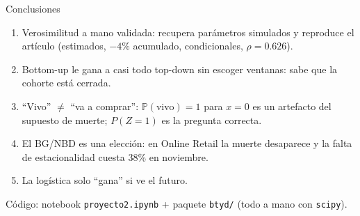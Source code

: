 \documentclass[aspectratio=169,10pt]{beamer}
\newcommand{\pvivo}{\mathbb{P}(\text{vivo})}
\begin{document}
\begin{frame}{Conclusiones}
\begin{enumerate}\small
  \item Verosimilitud a mano validada: recupera parámetros simulados y reproduce el artículo (estimados, $-4\%$ acumulado, condicionales, $\rho=0.626$).
  \item Bottom-up le gana a casi todo top-down sin escoger ventanas: sabe que la cohorte está cerrada.
  \item \alert{``Vivo'' $\neq$ ``va a comprar''}: $\pvivo=1$ para $x=0$ es un artefacto del supuesto de muerte; $P(Z=1)$ es la pregunta correcta.
  \item El BG/NBD es una elección: en Online Retail la muerte desaparece y la falta de estacionalidad cuesta 38\% en noviembre.
  \item La logística solo ``gana'' si ve el futuro.
\end{enumerate}
\vspace{0.5em}
\centering\small Código: notebook \texttt{proyecto2.ipynb} + paquete \texttt{btyd/} (todo a mano con \texttt{scipy}).
\end{frame}
\end{document}
